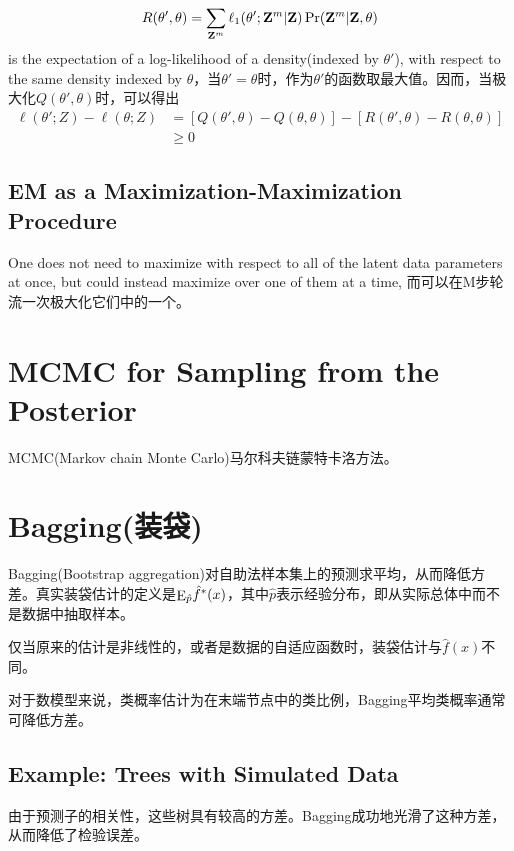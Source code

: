             \begin{equation}
                R(\theta ',\theta ) = \sum\limits_{{{\bf{Z}}^m}} {{\ell _1}(\theta ';{{\bf{Z}}^m}|{\bf{Z}})} \Pr ({{\bf{Z}}^m}|{\bf{Z}},\theta )
            \end{equation}
            is the expectation of a log-likelihood of a density(indexed by ${\theta '}$), with respect to the same density indexed by $\theta$，当$\theta ' = \theta$时，作为${\theta '}$的函数取最大值。因而，当极大化$Q(\theta ',\theta )$时，可以得出
            \begin{equation}
              \begin{aligned}
                \ell (\theta ';Z) - \ell (\theta ;Z) &= [Q(\theta ',\theta ) - Q(\theta ,\theta )] - [R(\theta ',\theta ) - R(\theta ,\theta )]\\
                &\ge 0
              \end{aligned}
            \end{equation}
        \subsection{EM as a Maximization-Maximization Procedure}
            One does not need to maximize with respect to all of the latent data parameters at once, but could instead maximize over one of them at a time, 而可以在M步轮流一次极大化它们中的一个。
    \section{MCMC for Sampling from the Posterior}
        MCMC(Markov chain Monte Carlo)马尔科夫链蒙特卡洛方法。
    \section{Bagging(装袋)}
        Bagging(Bootstrap aggregation)对自助法样本集上的预测求平均，从而降低方差。真实装袋估计的定义是${{\mathop{\rm E}\nolimits} _{\hat p}}{\hat f^*}(x)$，其中$\hat p$表示经验分布，即从实际总体中而不是数据中抽取样本。

        仅当原来的估计是非线性的，或者是数据的自适应函数时，装袋估计与${\hat f}(x)$不同。

        对于数模型来说，类概率估计为在末端节点中的类比例，Bagging平均类概率通常可降低方差。
        \subsection{Example: Trees with Simulated Data}
            由于预测子的相关性，这些树具有较高的方差。Bagging成功地光滑了这种方差，从而降低了检验误差。

